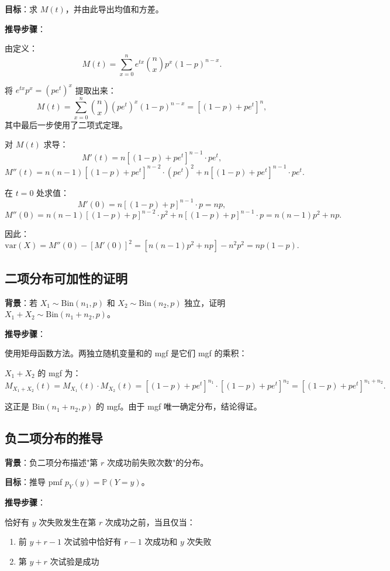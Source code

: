 \textbf{目标}：求 $M(t)$，并由此导出均值和方差。

\textbf{推导步骤}：

由定义：
\[
M(t) = \sum_{x=0}^{n} e^{tx} \binom{n}{x} p^{x}(1-p)^{n-x}.
\]

将 $e^{tx} p^{x} = (pe^{t})^{x}$ 提取出来：
\[
M(t) = \sum_{x=0}^{n} \binom{n}{x} (pe^{t})^{x} (1-p)^{n-x} = [(1-p) + pe^{t}]^{n},
\]
其中最后一步使用了二项式定理。

对 $M(t)$ 求导：
\[
M'(t) = n[(1-p) + pe^{t}]^{n-1} \cdot pe^{t},
\]
\[
M''(t) = n(n-1)[(1-p) + pe^{t}]^{n-2} \cdot (pe^{t})^{2} + n[(1-p) + pe^{t}]^{n-1} \cdot pe^{t}.
\]

在 $t=0$ 处求值：
\[
M'(0) = n[(1-p) + p]^{n-1} \cdot p = np,
\]
\[
M''(0) = n(n-1)[(1-p) + p]^{n-2} \cdot p^{2} + n[(1-p) + p]^{n-1} \cdot p = n(n-1)p^{2} + np.
\]

因此：
\[
\text{var}(X) = M''(0) - [M'(0)]^{2} = [n(n-1)p^{2} + np] - n^{2}p^{2} = np(1-p).
\]

\subsection{二项分布可加性的证明}\label{sec:derivation-binomial-additivity}

\textbf{背景}：若 $X_1 \sim \text{Bin}(n_1, p)$ 和 $X_2 \sim \text{Bin}(n_2, p)$ 独立，证明 $X_1 + X_2 \sim \text{Bin}(n_1 + n_2, p)$。

\textbf{推导步骤}：

使用矩母函数方法。两独立随机变量和的 mgf 是它们 mgf 的乘积：

$X_1 + X_2$ 的 mgf 为：
\[
M_{X_1+X_2}(t) = M_{X_1}(t) \cdot M_{X_2}(t) = [(1-p) + pe^{t}]^{n_1} \cdot [(1-p) + pe^{t}]^{n_2} = [(1-p) + pe^{t}]^{n_1+n_2}.
\]

这正是 $\text{Bin}(n_1 + n_2, p)$ 的 mgf。由于 mgf 唯一确定分布，结论得证。

\subsection{负二项分布的推导}\label{sec:derivation-negative-binomial}

\textbf{背景}：负二项分布描述"第 $r$ 次成功前失败次数"的分布。

\textbf{目标}：推导 pmf $p_Y(y) = \mathbb{P}(Y = y)$。

\textbf{推导步骤}：

恰好有 $y$ 次失败发生在第 $r$ 次成功之前，当且仅当：
\begin{enumerate}
\item 前 $y+r-1$ 次试验中恰好有 $r-1$ 次成功和 $y$ 次失败
\item 第 $y+r$ 次试验是成功
\end{enumerate}

